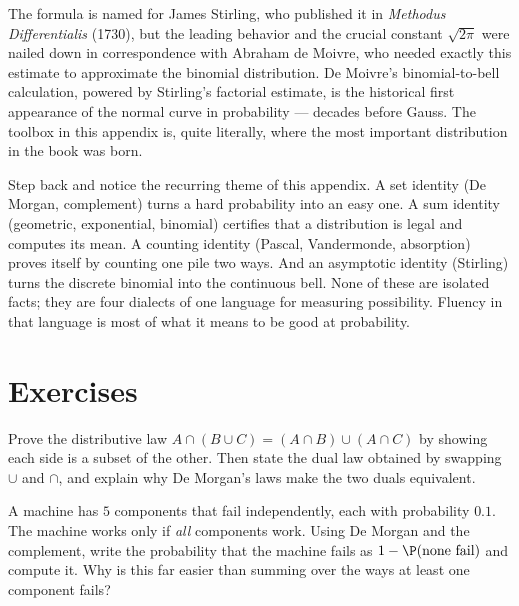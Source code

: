 \begin{historybox}
The formula is named for James Stirling, who published it in
\emph{Methodus Differentialis} (1730), but the leading behavior and the
crucial constant $\sqrt{2\pi}$ were nailed down in correspondence with
Abraham de Moivre, who needed exactly this estimate to approximate the
binomial distribution. De Moivre's binomial-to-bell calculation, powered by
Stirling's factorial estimate, is the historical first appearance of the
normal curve in probability --- decades before Gauss. The toolbox in this
appendix is, quite literally, where the most important distribution in the
book was born.
\end{historybox}

\begin{aestheticbox}
Step back and notice the recurring theme of this appendix. A set identity
(De Morgan, complement) turns a hard probability into an easy one. A sum
identity (geometric, exponential, binomial) certifies that a distribution is
legal and computes its mean. A counting identity (Pascal, Vandermonde,
absorption) proves itself by counting one pile two ways. And an asymptotic
identity (Stirling) turns the discrete binomial into the continuous bell. None
of these are isolated facts; they are four dialects of one language for
measuring possibility. Fluency in that language is most of what it means to be
good at probability.
\end{aestheticbox}

\section{Exercises}
\label{ch39:exercises}

\begin{exercise}
Prove the distributive law $A \cap (B \cup C) = (A \cap B) \cup (A \cap C)$ by
showing each side is a subset of the other. Then state the dual law obtained
by swapping $\cup$ and $\cap$, and explain why De Morgan's laws make the two
duals equivalent.
\end{exercise}

\begin{exercise}
A machine has $5$ components that fail independently, each with probability
$0.1$. The machine works only if \emph{all} components work. Using De Morgan
and the complement, write the probability that the machine fails as
$1 - \P(\text{none fail})$ and compute it. Why is this far easier than summing
over the ways at least one component fails?
\end{exercise}

